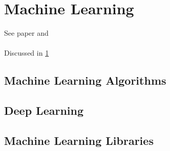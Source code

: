 
\section{Machine Learning}
\label{sec:machine-learning}

See paper \cite{Khraisat2019} and \cite{Hodo2017} \\

\lipsum \\
Discussed in \ref{sec:machine-learning}


\subsection{Machine Learning Algorithms}
\label{subsec:ml-algorithms}

\lipsum


\subsection{Deep Learning}
\label{subsec:deep-learning}

\lipsum


\subsection{Machine Learning Libraries}
\label{subsec:ml-libraries}

\lipsum[1-2]